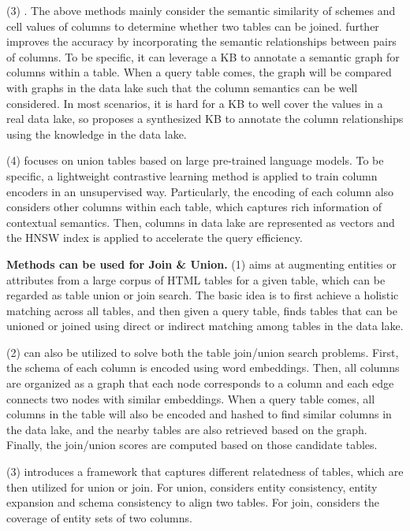   \noindent  (3) \santos. The above methods mainly consider  the semantic similarity of  schemes and cell values of columns to determine whether two tables can be joined.
   \santos further improves the accuracy by incorporating the semantic relationships between pairs of columns. To be specific,  it can leverage a KB to annotate a semantic graph for columns within a table. When a query table comes, the graph will be compared with graphs in the data lake such that the column semantics can be well considered. In most scenarios, it is hard for a KB to well cover the values in a real data lake, so \santos proposes a synthesized KB to annotate the column relationships using the knowledge in the data lake. 
 


 \noindent (4) \starmie focuses on union tables based on large  pre-trained language models. To be specific, a lightweight contrastive learning method is applied to train column encoders in an unsupervised way. Particularly, the encoding of each column also considers other columns within each table, which captures rich information of contextual semantics.
  Then, columns in data lake are represented as vectors and the HNSW index is applied to accelerate the query efficiency. 


\noindent\textbf{Methods can be used for Join \& Union.}
  (1) \infogather aims at augmenting entities or attributes from a large corpus of HTML tables for a given table, which can be regarded as table union or join search. The basic idea is to first achieve a holistic matching across all tables, and then  given a query table,  \infogather finds tables that can be unioned or joined using direct or indirect matching among tables in the data lake. 

 
  \noindent  (2) \aurum can also be utilized to solve  both the table join/union search problems. First, the schema of each column is encoded using word embeddings. Then, all columns are organized as a graph that each node corresponds to a column and each edge connects two nodes with similar embeddings. When a query table comes, all columns in the table will also be encoded and hashed to find similar columns in the data lake, and  the nearby tables are also retrieved based on the graph. Finally, the join/union scores are computed based on those candidate tables.   
  
 \noindent  (3) \frt introduces a framework that captures different relatedness of tables, which are then utilized for union or join. For union,  \frt considers entity consistency, entity expansion and schema consistency to align two tables. For join, \frt considers the coverage of entity sets of two columns. 

